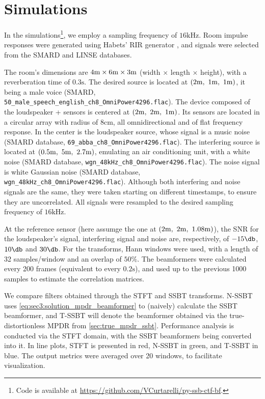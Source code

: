 
\section{Simulations}
\label{sec:results}

In the simulations\footnote{Code is available at \url{https://github.com/VCurtarelli/py-ssb-ctf-bf}.}, we employ a sampling frequency of $16\si{\kilo\hertz}$. Room impulse responses were generated using Habets' RIR generator \cite{habets_rir-generator}, and signals were selected from the SMARD \cite{smard_database} and LINSE \cite{linse_database} databases.

The room's dimensions are $4\si{\meter} \times 6\si{\meter} \times 3\si{\meter}$ (width $\times$ length $\times$ height), with a reverberation time of $0.3\si{\second}$. The desired source is located at $(2\si{\meter},~1\si{\meter},~1\si{\meter})$, it being a male voice (SMARD, \texttt{50\_male\_speech\_english\_ch8\_OmniPower4296.flac}).
%
The device composed of the loudspeaker + sensors is centered at $(2\si{\meter},~2\si{\meter},~1\si{\meter})$. Its sensors are located in a circular array with radius of $8\si{\centi\meter}$, all omnidirectional and of flat frequency response. In the center is the loudspeaker source, whose signal is a music noise (SMARD database, \texttt{69\_abba\_ch8\_OmniPower4296.flac}). The interfering source is located at $(0.5\si{\meter},~5\si{\meter},~2.7\si{\meter})$, emulating an air conditioning unit, with a white noise (SMARD database, \texttt{wgn\_48kHz\_ch8\_OmniPower4296.flac}). The noise signal is white Gaussian noise (SMARD database, \texttt{wgn\_48kHz\_ch8\_OmniPower4296.flac}). Although both interfering and noise signals are the same, they were taken starting on different timestamps, to ensure they are uncorrelated. All signals were resampled to the desired sampling frequency of $16\si{\kilo\hertz}$.

At the reference sensor (here assumge the one at $(2\si{\meter},~2\si{\meter},~1.08\si{\meter})$), the SNR for the loudspeaker's signal, interfering signal and noise are, respectively, of $-15\dB$, $10\dB$ and $30\dB$. For the transforms, Hann windows were used, with a length of 32 samples/window and an overlap of $50\%$. The beamformers were calculated every 200 frames (equivalent to every $0.2\si{\second}$), and used up to the previous 1000 samples to estimate the correlation matrices.

We compare filters obtained through the STFT and SSBT transforms. N-SSBT uses \cref{eq:sec3:solution_mpdr_beamformer} to (naively) calculate the SSBT beamformer, and T-SSBT will denote the beamformer obtained via the true-distortionless MPDR from \cref{sec:true_mpdr_ssbt}. Performance analysis is conducted via the STFT domain, with the SSBT beamformers being converted into it. In line plots, STFT is presented in red, N-SSBT in green, and T-SSBT in blue. The output metrics were averaged over 20 windows, to facilitate visualization.

